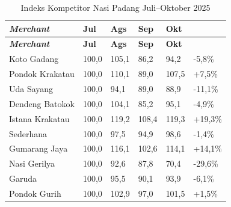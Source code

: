 \begingroup
\small
\begin{xltabular}{\textwidth}{|Y|C{1.15cm}|C{1.15cm}|C{1.15cm}|C{1.15cm}|C{1.75cm}|}
\caption{Indeks Kompetitor Nasi Padang Juli--Oktober 2025}
\label{tab:indeks_kompetitor_grabfood} \\
        \toprule
        \textbf{\textit{Merchant}} & \textbf{Jul} & \textbf{Ags} & \textbf{Sep} & \textbf{Okt} & \textbf{} \\ \hline
        \midrule
\endfirsthead
{}
        \toprule
        \textbf{\textit{Merchant}} & \textbf{Jul} & \textbf{Ags} & \textbf{Sep} & \textbf{Okt} & \textbf{} \\ \hline
        \midrule
\endhead
{}
\endfoot
        \bottomrule
        \endlastfoot
        Koto Gadang                & 100,0        & 105,1        & 86,2         & 94,2         & -5,8\%                                  \\ \hline
        Pondok Krakatau            & 100,0        & 110,1        & 89,0         & 107,5        & +7,5\%                                  \\ \hline
        Uda Sayang                 & 100,0        & 94,1         & 89,0         & 88,9         & -11,1\%                                 \\ \hline
        Dendeng Batokok            & 100,0        & 104,1        & 85,2         & 95,1         & -4,9\%                                  \\ \hline
        Istana Krakatau            & 100,0        & 119,2        & 108,4        & 119,3        & +19,3\%                                 \\ \hline
        Sederhana                  & 100,0        & 97,5         & 94,9         & 98,6         & -1,4\%                                  \\ \hline
        Gumarang Jaya              & 100,0        & 116,1        & 102,6        & 114,1        & +14,1\%                                 \\ \hline
        Nasi Gerilya               & 100,0        & 92,6         & 87,8         & 70,4         & -29,6\%                                 \\ \hline
        Garuda                     & 100,0        & 95,5         & 90,1         & 93,9         & -6,1\%                                  \\ \hline
        Pondok Gurih               & 100,0        & 102,9        & 97,0         & 101,5        & +1,5\%                                  \\ \hline
        \bottomrule
    
\end{xltabular}
\endgroup

